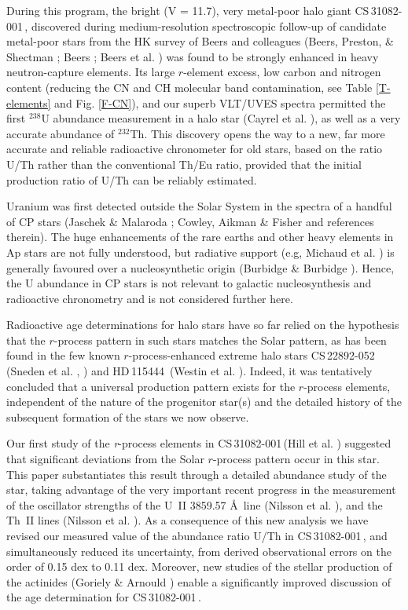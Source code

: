 \documentclass{aa}
\def\cs{CS\,31082-001\,}
\def\sned{CS\,22892-052\,}
\def\hd115{HD\,115444\,}
\begin{document}
During this program, the bright (V = 11.7), very metal-poor halo giant \cs,
discovered during medium-resolution spectroscopic follow-up of candidate
metal-poor stars from the HK survey of Beers and colleagues (Beers, Preston, \&
Shectman \cite{beers92}; Beers \cite{beers99}; Beers et al. \cite{beers02b})
was found to be strongly enhanced in heavy neutron-capture elements.  Its large
$r$-element excess, low carbon and nitrogen content (reducing the CN and CH
molecular band contamination, see Table \ref{T-elements} and Fig.
\ref{F-CN}), and our superb VLT/UVES spectra permitted the first $^{238}$U
abundance measurement in a halo star (Cayrel et al. \cite{cayrel01}), as well
as a very accurate abundance of $^{232}$Th. This discovery opens the way to a
new, far more accurate and reliable radioactive chronometer for old stars,
based on the ratio U/Th rather than the conventional Th/Eu ratio, provided that
the initial production ratio of U/Th can be reliably estimated.

Uranium was first detected outside the Solar System in the spectra of
a handful of CP stars (Jaschek \& Malaroda \cite{jm70}; Cowley, Aikman
\& Fisher  
\cite{cow77} and references therein). The huge enhancements of the rare earths 
and other heavy elements in Ap stars are not fully understood, but
radiative support (e.g, Michaud et al. \cite{michaud76}) 
is generally favoured over a 
nucleosynthetic origin (Burbidge \& Burbidge \cite{burbige55}). Hence, the U 
abundance in CP stars is not relevant to galactic nucleosynthesis and 
radioactive chronometry and is not considered further here. 

Radioactive age determinations for halo stars have so far relied on the
hypothesis that the $r$-process pattern in such stars matches the Solar
pattern, as has been found in the few known $r$-process-enhanced extreme halo
stars \sned (Sneden et al. \cite{sneden96}, \cite{sneden00}) and \hd115 (Westin
et  al. \cite{westin00}). Indeed, it was tentatively concluded that a universal
production pattern exists for the $r$-process elements, independent of the
nature of the progenitor star(s) and the detailed history of the subsequent
formation of the stars we now observe.

Our first study of the {\it r}-process elements in \cs (Hill et al.
\cite{hill01}) suggested that significant deviations from the Solar
$r$-process pattern occur in this star. This paper substantiates this result
through a detailed abundance study of the star, taking advantage of the very
important recent progress in the measurement of the oscillator strengths of the
U~II  3859.57 \AA\ line (Nilsson et al. \cite{nilsson01a}), and the Th~II lines
(Nilsson et al. \cite{nilsson01b}). As a consequence of this new analysis we
have revised our measured value of the abundance ratio U/Th in \cs, and
simultaneously reduced its uncertainty, from derived observational errors on
the order of 0.15 dex to 0.11 dex. Moreover, new studies of the stellar
production of the actinides (Goriely \& Arnould \cite{ga01}) enable a 
significantly improved discussion of the age determination for \cs.
\end{document}
